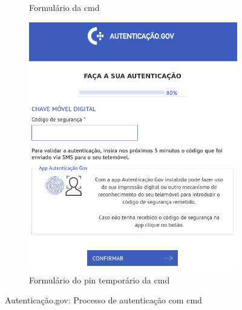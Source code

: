 \begin{figure}[H]
\begin{subfigure}{.32\textwidth}
        \caption{Formulário da \acrshort{cmd}\label{fig:CMDcreds}}
    \end{subfigure}
    \begin{subfigure}{.32\textwidth}
        \centering
        \includegraphics[width=1\linewidth]{img/CMDcredTemp.png}
        \caption{Formulário do \acrshort{pin} temporário da \acrshort{cmd}\label{fig:CMDcredTemp}}
    \end{subfigure}
    \caption{Autenticação.gov: Processo de autenticação com \acrshort{cmd}}
\end{figure}

